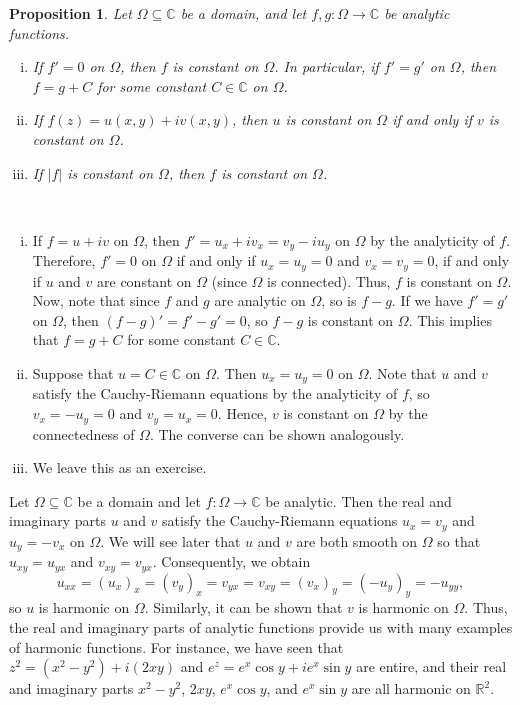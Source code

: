 \documentclass[10pt]{article}
\makeatletter
\newcommand{\R}{\mathbb{R}}
\newcommand{\C}{\mathbb{C}}
\theoremstyle{newstyle}
\newtheorem{prop}[thm]{Proposition}
\newenvironment{pf}[1][\proofname]{\par
  \pushQED{\qed}%
  \normalfont \topsep0\p@\relax
  \trivlist
  \item[\hskip\labelsep\scshape
  #1\@addpunct{.}]\ignorespaces
}{%
  \popQED\endtrivlist\@endpefalse
}
\makeatother
\begin{document}
\begin{prop}
Let $\Omega \subseteq \C$ be a domain, and let $f, g : \Omega \to \C$ be analytic functions.
\begin{enumerate}[(i)]
    \item If $f' = 0$ on $\Omega$, then $f$ is constant on $\Omega$. In particular, if 
    $f' = g'$ on $\Omega$, then $f = g+C$ for some constant $C \in \C$ on $\Omega$. 
    \item If $f(z) = u(x, y) + iv(x, y)$, then $u$ is constant on $\Omega$ if and only if $v$ is 
    constant on $\Omega$.
    \item If $|f|$ is constant on $\Omega$, then $f$ is constant on $\Omega$.
\end{enumerate}
\end{prop}
\begin{pf}~
\begin{enumerate}[(i)]
    \item If $f = u+iv$ on $\Omega$, then $f' = u_x + iv_x = v_y - iu_y$ on $\Omega$ by the 
    analyticity of $f$. Therefore, $f' = 0$ on $\Omega$ if and only if $u_x = u_y = 0$ and $v_x = 
    v_y = 0$, if and only if $u$ and $v$ are constant on $\Omega$ (since $\Omega$ is connected). 
    Thus, $f$ is constant on $\Omega$. Now, note that since $f$ and $g$ are analytic on $\Omega$, 
    so is $f - g$. If we have $f' = g'$ on $\Omega$, then $(f-g)' = f'-g' = 0$, so $f-g$ is 
    constant on $\Omega$. This implies that $f = g+C$ for some constant $C \in \C$. 
    \item Suppose that $u = C \in \C$ on $\Omega$. Then $u_x = u_y = 0$ on $\Omega$. 
    Note that $u$ and $v$ satisfy the Cauchy-Riemann equations by the analyticity of $f$, 
    so $v_x = -u_y = 0$ and $v_y = u_x = 0$. Hence, $v$ is constant on $\Omega$ by the 
    connectedness of $\Omega$. The converse can be shown analogously.
    \item We leave this as an exercise. \qedhere 
\end{enumerate}
\end{pf}

Let $\Omega \subseteq \C$ be a domain and let $f : \Omega \to \C$ be analytic. Then the real and imaginary
parts $u$ and $v$ satisfy the Cauchy-Riemann equations $u_x = v_y$ and $u_y = -v_x$ on $\Omega$. 
We will see later that $u$ and $v$ are both smooth on $\Omega$ so that $u_{xy} = u_{yx}$ 
and $v_{xy} = v_{yx}$. Consequently, we obtain 
\[ u_{xx} = (u_x)_x = (v_y)_x = v_{yx} = v_{xy} = (v_x)_y = (-u_y)_y = -u_{yy}, \]
so $u$ is harmonic on $\Omega$. Similarly, it can be shown that $v$ is harmonic on $\Omega$. 
Thus, the real and imaginary parts of analytic functions provide us with many examples of harmonic 
functions. For instance, we have seen that $z^2 = (x^2 - y^2) + i(2xy)$ and 
$e^z = e^x\cos y + ie^x \sin y$ are entire, and their real and imaginary parts 
$x^2 - y^2$, $2xy$, $e^x \cos y$, and $e^x \sin y$ are all harmonic on $\R^2$. 
\end{document}
